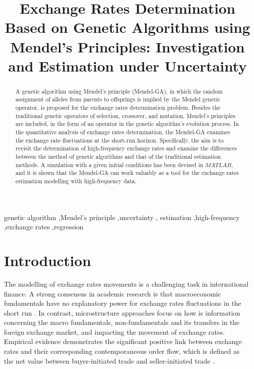 

\linenumbers

\begin{frontmatter}

\title{Exchange Rates Determination Based on Genetic Algorithms using Mendel's Principles: Investigation and Estimation under Uncertainty}


\begin{abstract}
\label{abstract}
A genetic algorithm using Mendel's principle (Mendel-GA), in which the random
assignment of alleles from parents to offsprings is implied by the
Mendel genetic operator, is proposed for the exchange rates determination problem.
Besides the traditional genetic operators of selection, crossover, and mutation, Mendel's principles are
included, in the form of an operator in the genetic algorithm's evolution process. In
the quantitative analysis of exchange rates determination, the
Mendel-GA examines the exchange rate fluctuations at the
short-run horizon. Specifically, the aim is to revisit the
determination of high-frequency exchange rates and examine the
differences between the method of genetic algorithms and that of the
traditional estimation methods. A simulation with a given initial
conditions has been devised in $MATLAB$, and it is shown that the
Mendel-GA can work valuably as a tool for the exchange rates
estimation modelling with high-frequency data.
\end{abstract}

\begin{keyword}
genetic algorithm \sep Mendel's principle  \sep uncertainty \sep
estimation \sep high-frequency \sep exchange rates \sep regression
\end{keyword}

\end{frontmatter}


\section{Introduction}
\label{Introduction}

The modelling of exchange rates movements is a challenging task in
international finance. A strong consensus in academic research is
that macroeconomic fundamentals have no explanatory power for
exchange rates fluctuations in the short run \cite{Obstfeld2000,Rogoff1996}. In contrast, microstructure approaches focus on
how is information concerning the macro fundamentals,
non-fundamentals and its transfers in the foreign exchange market,
and impacting the movement of exchange rates. Empirical evidence
demonstrates the significant positive link between exchange rates and
their corresponding contemporaneous order flow, which is defined as
the net value between buyer-initiated trade and seller-initiated
trade \cite{Lyons2001,Killeen2001,Payne2003}.

